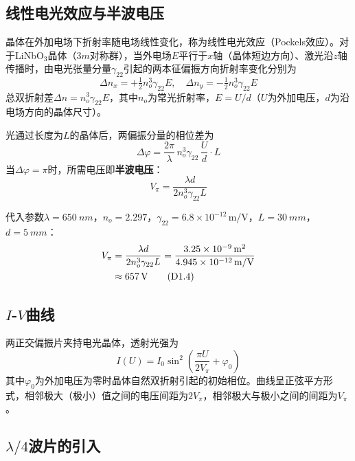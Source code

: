 \documentclass[a4paper,8pt,twocolumn]{article}
\begin{document}
\subsection{线性电光效应与半波电压}

晶体在外加电场下折射率随电场线性变化，称为线性电光效应（Pockels效应）。对于LiNbO$_3$晶体（$3m$对称群），当外电场$E$平行于$x$轴（晶体短边方向）、激光沿$z$轴传播时，由电光张量分量$\gamma_{22}$引起的两本征偏振方向折射率变化分别为
\begin{equation}
  \Delta n_x = +\tfrac{1}{2}n_o^3\gamma_{22}E,\quad
  \Delta n_y = -\tfrac{1}{2}n_o^3\gamma_{22}E
  \tag{D1.1}
\end{equation}
总双折射差$\Delta n = n_o^3\gamma_{22}E$，其中$n_o$为常光折射率，$E=U/d$（$U$为外加电压，$d$为沿电场方向的晶体尺寸）。

光通过长度为$L$的晶体后，两偏振分量的相位差为
\begin{equation}
  \Delta\varphi = \frac{2\pi}{\lambda}\,n_o^3\gamma_{22}\,\frac{U}{d}\cdot L
  \tag{D1.2}
\end{equation}
当$\Delta\varphi=\pi$时，所需电压即\textbf{半波电压}：
\begin{equation}
  V_\pi = \frac{\lambda d}{2n_o^3\gamma_{22}L}
  \tag{D1.3}
\end{equation}

代入参数$\lambda=\SI{650}{nm}$，$n_o=2.297$，$\gamma_{22}=6.8\times10^{-12}$\,m/V，$L=\SI{30}{mm}$，$d=\SI{5}{mm}$：
\begin{align}
  V_\pi &= \frac{\lambda d}{2n_o^3\gamma_{22}L}
  = \frac{3.25\times10^{-9}\,\text{m}^2}{4.945\times10^{-12}\,\text{m/V}}
  \notag\\
  &\approx \SI{657}{V}
  \tag{D1.4}
\end{align}

\subsection{$I$-$V$曲线}

两正交偏振片夹持电光晶体，透射光强为
\begin{equation}
  I(U) = I_0\sin^2\!\!\left(\frac{\pi U}{2V_\pi}+\varphi_0\right)
  \tag{D1.5}
\end{equation}
其中$\varphi_0$为外加电压为零时晶体自然双折射引起的初始相位。曲线呈正弦平方形式，相邻极大（极小）值之间的电压间距为$2V_\pi$，相邻极大与极小之间的间距为$V_\pi$。

\subsection{$\lambda/4$波片的引入}
\end{document}
